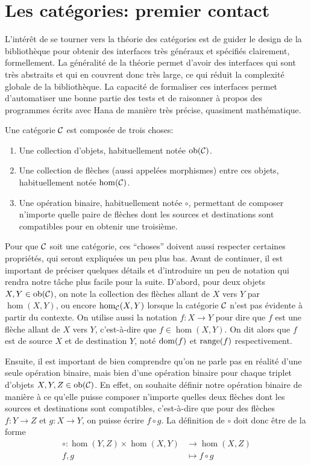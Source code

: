 \section{Les catégories: premier contact}
L'intérêt de se tourner vers la théorie des catégories est de guider le
design de la bibliothèque pour obtenir des interfaces très généraux et
spécifiés clairement, formellement. La généralité de la théorie permet
d'avoir des interfaces qui sont très abstraits et qui en couvrent donc
très large, ce qui réduit la complexité globale de la bibliothèque. La
capacité de formaliser ces interfaces permet d'automatiser une bonne partie
des tests et de raisonner à propos des programmes écrits avec Hana de manière
très précise, quasiment mathématique.

\begin{définition}[Catégorie]
    Une catégorie $\mathcal{C}$ est composée de trois choses:
    \begin{enumerate}
        \item Une collection d'objets, habituellement notée $\mathrm{ob}(\mathcal{C})$.
        \item Une collection de flèches (aussi appelées morphismes) entre ces
              objets, habituellement notée $\hom(\mathcal{C})$.
        \item Une opération binaire, habituellement notée $\circ$, permettant de
              composer n'importe quelle paire de flèches dont les sources et
              destinations sont compatibles pour en obtenir une troisième.
    \end{enumerate}
\end{définition}

Pour que $\mathcal{C}$ soit une catégorie, ces ``choses'' doivent aussi respecter
certaines propriétés, qui seront expliquées un peu plus bas. Avant de
continuer, il est important de préciser quelques détails et d'introduire
un peu de notation qui rendra notre tâche plus facile pour la suite. D'abord,
pour deux objets $X, Y \in \mathrm{ob}(\mathcal{C})$, on note la collection des flèches allant
de $X$ vers $Y$ par $\hom(X, Y)$, ou encore $\hom_{\mathcal{C}}(X, Y)$ lorsque la catégorie
$\mathcal{C}$ n'est pas évidente à partir du contexte. On utilise aussi la notation
$f : X \to Y$ pour dire que $f$ est une flèche allant de $X$ vers $Y$,
c'est-à-dire que $f \in \hom(X, Y)$. On dit alors que $f$ est de source
$X$ et de destination $Y$, noté $\mathrm{dom}(f)$ et $\mathrm{range}(f)$ respectivement.

Ensuite, il est important de bien comprendre qu'on ne parle pas en réalité
d'une seule opération binaire, mais bien d'une opération binaire pour chaque
triplet d'objets $X, Y, Z \in \mathrm{ob}(\mathcal{C})$. En effet, on souhaite définir notre
opération binaire de manière à ce qu'elle puisse composer n'importe quelles
deux flèches dont les sources et destinations sont compatibles, c'est-à-dire
que pour des flèches $f : Y \to Z$ et $g : X \to Y$, on puisse écrire
$f \circ g$. La définition de $\circ$ doit donc être de la forme
\begin{align*}
    \circ : \hom(Y, Z) \times \hom(X, Y) &\to \hom(X, Z) \\
             f, g &\mapsto f \circ g
\end{align*}

